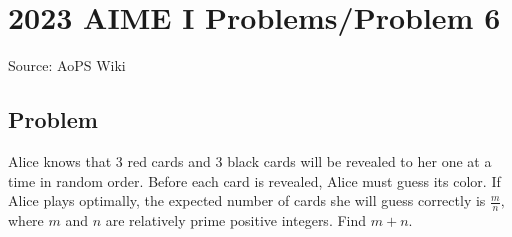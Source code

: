 \documentclass[12pt]{article}
\begin{document}
\section*{{2023 AIME I Problems/Problem 6}}
Source: AoPS Wiki

\subsection*{Problem}
Alice knows that $3$ red cards and $3$ black cards will be revealed to her one at a time in random order. Before each card is revealed, Alice must guess its color. If Alice plays optimally, the expected number of cards she will guess correctly is $\frac{m}{n},$ where $m$ and $n$ are relatively prime positive integers. Find $m+n.$
\end{document}
